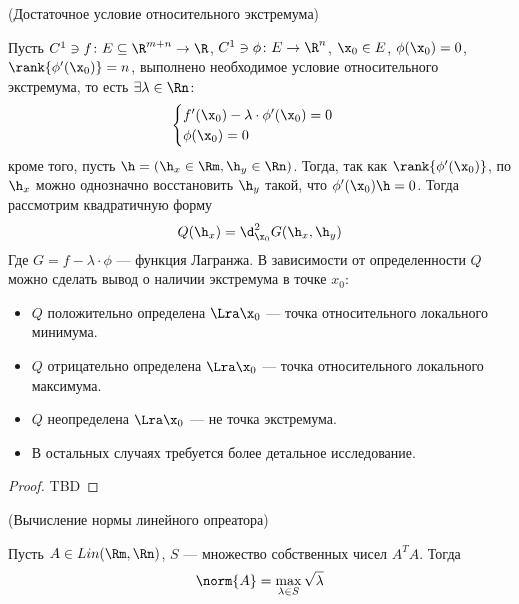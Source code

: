 \begin{theorem}(Достаточное условие относительного экстремума)

    Пусть $C^1 \ni f \colon E \subseteq \R^{m + n} \to \R$, $C^1 \ni \phi \colon
    E \to \R^n$, $\x_0 \in E$, $\phi(\x_0) = 0$, $\rank{\phi'(\x_0)} = n$,
    выполнено необходимое условие относительного экстремума, то есть $\exists
    \lambda \in \Rn \colon$
 \[
     \begin{cases}
         f'(\x_0) - \lambda \cdot \phi'(\x_0) = 0 \\
         \phi(\x_0) = 0
     \end{cases}
 \]
    кроме того, пусть $\h = (\h_x \in \Rm, \h_y \in \Rn)$. Тогда, так как
    $\rank{\phi'(\x_0)}$, по $\h_x$ можно однозначно восстановить $\h_y$ такой,
    что $\phi'(\x_0)\h = 0$. Тогда рассмотрим квадратичную форму
\[
    Q(\h_x) = \d^2_{\x_0}{G(\h_x, \h_y)}
\]
    Где $G = f - \lambda \cdot \phi$ --- функция Лагранжа. В зависимости от
    определенности $Q$ можно сделать вывод о наличии экстремума в точке $x_0$:
    \begin{itemize}
        \item $Q$ положительно определена $\Lra \x_0$ --- точка относительного
        локального минимума.
        \item $Q$ отрицательно определена $\Lra \x_0$ --- точка относительного
        локального максимума.
        \item $Q$ неопределена $\Lra \x_0$ --- не точка экстремума.
        \item В остальных случаях требуется более детальное исследование.
    \end{itemize}
\end{theorem}
\begin{proof}
    TBD
\end{proof}

\begin{theorem}(Вычисление нормы линейного опреатора)

    Пусть $A \in Lin(\Rm, \Rn)$, $S$ --- множество собственных чисел $A^T A$.
    Тогда
\[
    \norm{A} = \max_{\lambda \in S}{\sqrt{\lambda}}
\]
\end{theorem}
